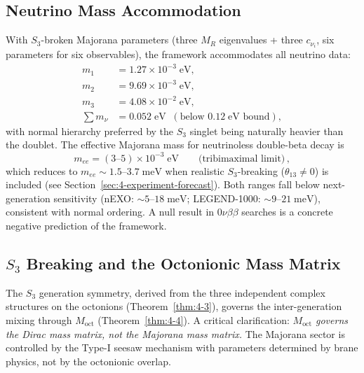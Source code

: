 \subsection{Neutrino Mass Accommodation}
\label{sec:4-nu-mass}

With $S_3$-broken Majorana parameters (three $M_R$ eigenvalues + three $c_{\nu_i}$, six parameters for six observables), the framework accommodates all neutrino data:
\begin{equation}
\begin{aligned}
  m_1 &= 1.27 \times 10^{-3}\;\mathrm{eV},\\
  m_2 &= 9.69 \times 10^{-3}\;\mathrm{eV},\\
  m_3 &= 4.08 \times 10^{-2}\;\mathrm{eV},\\
  \textstyle\sum m_\nu &= 0.052\;\mathrm{eV} \;\;(\text{below } 0.12\;\mathrm{eV}\text{ bound}),
\end{aligned}
  \label{eq:4-110}
\end{equation}
with normal hierarchy preferred by the $S_3$ singlet being naturally heavier than the doublet. The effective Majorana mass for neutrinoless double-beta decay is
\begin{equation}
  m_{ee} = (3\text{--}5) \times 10^{-3}\;\mathrm{eV} \qquad \text{(tribimaximal limit)}\,,
  \label{eq:4-111}
\end{equation}
which reduces to $m_{ee} \sim 1.5$--$3.7\;\mathrm{meV}$ when realistic $S_3$-breaking ($\theta_{13} \neq 0$) is included (see Section~\ref{sec:4-experiment-forecast}). Both ranges fall below next-generation sensitivity (nEXO: $\sim 5\text{--}18\;\mathrm{meV}$; LEGEND-1000: $\sim 9\text{--}21\;\mathrm{meV}$), consistent with normal ordering. A null result in $0\nu\beta\beta$ searches is a concrete negative prediction of the framework.


\subsection{\texorpdfstring{$S_3$}{S3} Breaking and the Octonionic Mass Matrix}
\label{sec:4-s3-breaking}

The $S_3$ generation symmetry, derived from the three independent complex structures on the octonions (Theorem~\ref{thm:4-3}), governs the inter-generation mixing through $M_{\mathrm{oct}}$ (Theorem~\ref{thm:4-4}).  A critical clarification: \emph{$M_{\mathrm{oct}}$ governs the Dirac mass matrix, not the Majorana mass matrix.}  The Majorana sector is controlled by the Type-I seesaw mechanism with parameters determined by brane physics, not by the octonionic overlap.

